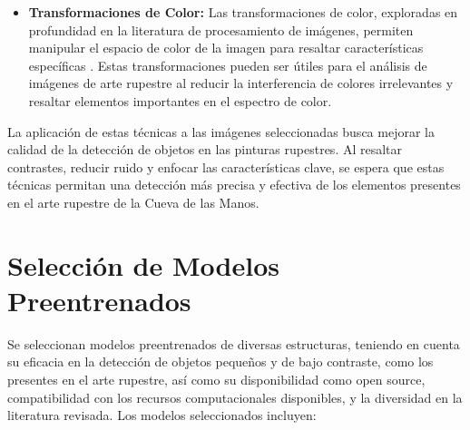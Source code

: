 \begin{itemize}
    \item \textbf{Transformaciones de Color:}
    Las transformaciones de color, exploradas en profundidad en la literatura de procesamiento de imágenes, permiten manipular el espacio de color de la imagen para resaltar características específicas \cite{gonzalesWood}.
    Estas transformaciones pueden ser útiles para el análisis de imágenes de arte rupestre al reducir la interferencia de colores irrelevantes y resaltar elementos importantes en el espectro de color.
\end{itemize}

La aplicación de estas técnicas a las imágenes seleccionadas busca mejorar la calidad de la detección de objetos en las pinturas rupestres.
Al resaltar contrastes, reducir ruido y enfocar las características clave, se espera que estas técnicas permitan una detección más precisa y efectiva de los elementos presentes en el arte rupestre de la Cueva de las Manos.

\section{Selección de Modelos Preentrenados}
Se seleccionan modelos preentrenados de diversas estructuras, teniendo en cuenta su eficacia en la detección de objetos pequeños y de bajo contraste, como los presentes en el arte rupestre, así como su disponibilidad como open source, compatibilidad con los recursos computacionales disponibles, y la diversidad en la literatura revisada.
Los modelos seleccionados incluyen:

